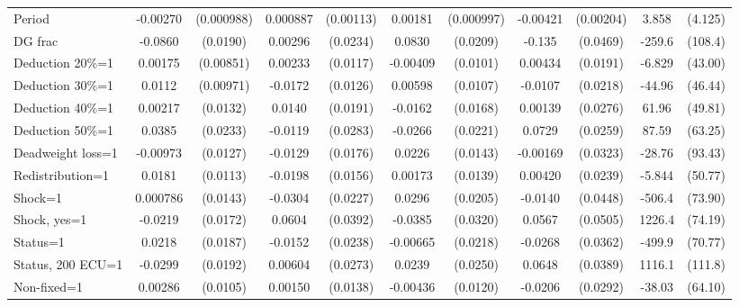 \begin{tabular}{l|cccccc|cc|cc}
Period          & -0.00270\sym{***}&(0.000988)& 0.000887         &(0.00113)&  0.00181\sym{*}  &(0.000997)& -0.00421\sym{**} &(0.00204)&    3.858         &  (4.125)\\
DG frac         &  -0.0860\sym{***}& (0.0190)&  0.00296         & (0.0234)&   0.0830\sym{***}& (0.0209)&   -0.135\sym{***}& (0.0469)&   -259.6\sym{**} &  (108.4)\\
Deduction 20\%=1&  0.00175         &(0.00851)&  0.00233         & (0.0117)& -0.00409         & (0.0101)&  0.00434         & (0.0191)&   -6.829         &  (43.00)\\
Deduction 30\%=1&   0.0112         &(0.00971)&  -0.0172         & (0.0126)&  0.00598         & (0.0107)&  -0.0107         & (0.0218)&   -44.96         &  (46.44)\\
Deduction 40\%=1&  0.00217         & (0.0132)&   0.0140         & (0.0191)&  -0.0162         & (0.0168)&  0.00139         & (0.0276)&    61.96         &  (49.81)\\
Deduction 50\%=1&   0.0385\sym{*}  & (0.0233)&  -0.0119         & (0.0283)&  -0.0266         & (0.0221)&   0.0729\sym{***}& (0.0259)&    87.59         &  (63.25)\\
Deadweight loss=1& -0.00973         & (0.0127)&  -0.0129         & (0.0176)&   0.0226         & (0.0143)& -0.00169         & (0.0323)&   -28.76         &  (93.43)\\
Redistribution=1&   0.0181         & (0.0113)&  -0.0198         & (0.0156)&  0.00173         & (0.0139)&  0.00420         & (0.0239)&   -5.844         &  (50.77)\\
Shock=1         & 0.000786         & (0.0143)&  -0.0304         & (0.0227)&   0.0296         & (0.0205)&  -0.0140         & (0.0448)&   -506.4\sym{***}&  (73.90)\\
Shock, yes=1    &  -0.0219         & (0.0172)&   0.0604         & (0.0392)&  -0.0385         & (0.0320)&   0.0567         & (0.0505)&   1226.4\sym{***}&  (74.19)\\
Status=1        &   0.0218         & (0.0187)&  -0.0152         & (0.0238)& -0.00665         & (0.0218)&  -0.0268         & (0.0362)&   -499.9\sym{***}&  (70.77)\\
Status, 200 ECU=1&  -0.0299         & (0.0192)&  0.00604         & (0.0273)&   0.0239         & (0.0250)&   0.0648\sym{*}  & (0.0389)&   1116.1\sym{***}&  (111.8)\\
Non-fixed=1     &  0.00286         & (0.0105)&  0.00150         & (0.0138)& -0.00436         & (0.0120)&  -0.0206         & (0.0292)&   -38.03         &  (64.10)\\

\end{tabular}
